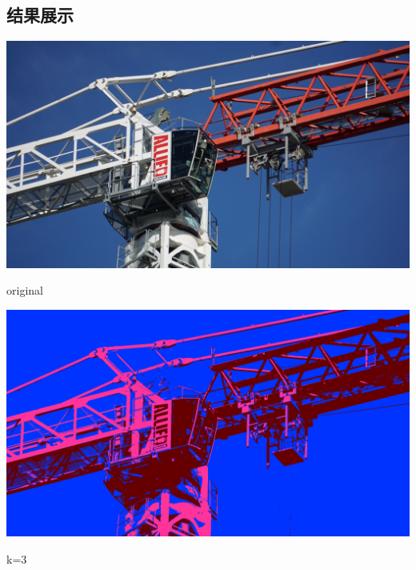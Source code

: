 \documentclass{article}
\begin{document}
\begin{newpage}
    \newcommand{\gap}{4pt}
    \subsection{结果展示}
    \begin{center}
        \begin{minipage}{0.9\linewidth}
            
            \begin{minipage}{0.5\linewidth}
                \vspace{\gap}
                \centerline{\includegraphics[width=\textwidth]{../python/crane.jpg}}
                \centerline{original}
            \end{minipage}
            \begin{minipage}{0.5\linewidth}
                \vspace{\gap}
                \centerline{\includegraphics[width=\textwidth]{src/crane_c3_output.png}}
                \centerline{k=3}
            \end{minipage}\\
        

\end{minipage}
\end{center}
\end{newpage}
\end{document}
